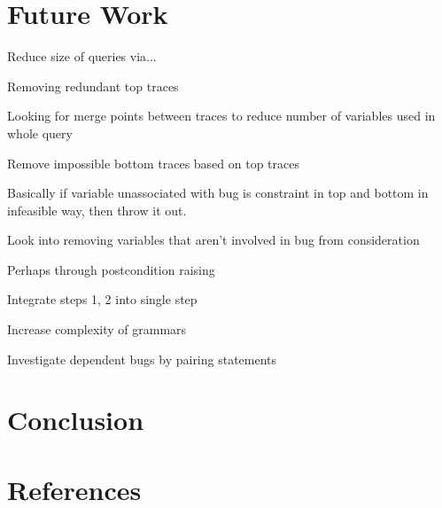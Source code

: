 \documentclass[]{article}
\begin{document}


\section{Future Work}

Reduce size of queries via...

Removing redundant top traces

Looking for merge points between traces to reduce number of variables used in whole query

Remove impossible bottom traces based on top traces

Basically if variable unassociated with bug is constraint in top and bottom
in infeasible way, then throw it out.

Look into removing variables that aren't involved in bug from consideration

Perhaps through postcondition raising

Integrate steps 1, 2 into single step

Increase complexity of grammars

Investigate dependent bugs by pairing statements

\section{Conclusion}

\section{References}
\end{document}
